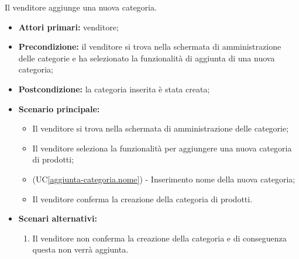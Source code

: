 \label{aggiunta-categoria}

Il venditore aggiunge una nuova categoria.
\begin{itemize}
    \item \textbf{Attori primari:} venditore;
    \item \textbf{Precondizione:} il venditore si trova nella schermata di amministrazione delle categorie e ha selezionato la funzionalità di aggiunta di una nuova categoria;
    \item \textbf{Postcondizione:} la categoria inserita è stata creata;
    \item \textbf{Scenario principale:}
    \begin{itemize}
    	\item Il venditore si trova nella schermata di amministrazione delle categorie;
    	\item Il venditore seleziona la funzionalità per aggiungere una nuova categoria di prodotti;
    	\item (UC\ref{aggiunta-categoria.nome}) - Inserimento nome della nuova categoria;
    	\item Il venditore conferma la creazione della categoria di prodotti.
    \end{itemize} 
    \item \textbf{Scenari alternativi:}
    \begin{enumerate}[label=\lett]
    	\item Il venditore non conferma la creazione della categoria e di conseguenza questa non verrà aggiunta.
    \end{enumerate}
\end{itemize}

\label{aggiunta-categoria.nome}

